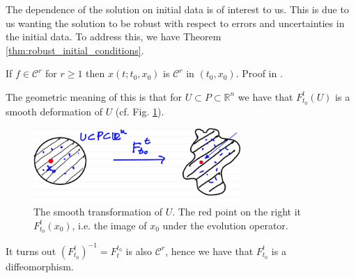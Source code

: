 The dependence of the solution on initial data is of interest to us. This is due to us wanting the solution to be robust with respect to errors and uncertainties in the initial data. To address this, we have Theorem \ref{thm:robust_initial_conditions}.
\begin{theorem}[]
	If $f \in \mathcal{C}^r$ for $r\geq 1$ then $ {x}(t; t_0,  {x}_0)$ is $\mathcal{C}^r$ in $(t_0,  {x}_0)$. Proof in \cite{Arnold}.
	\label{thm:robust_initial_conditions}
\end{theorem}

The geometric meaning of this is that for $U \subset P \subset \mathbb{R}^{n}$ we have that $F_{t_0}^{t}(U)$ is a smooth deformation of $U$ (cf. Fig. \ref{fig:deformation}).
\begin{figure}[h!]
	\centering
	\includegraphics[width=0.7\textwidth]{figures/ch1/7smooth_transform.png}
	\caption{The smooth transformation of $U$. The red point on the right it $F _{t_0}^t( {x}_0)$, i.e. the image of $ {x}_0$ under the evolution operator.}
	\label{fig:deformation}
\end{figure}
It turns out $\left(F_{t_0}^{t}\right)^{-1} = F_{t}^{t_0}$ is also $\mathcal{C}^r$, hence we have that $F_{t_0}^{t}$ is a diffeomorphism. 

